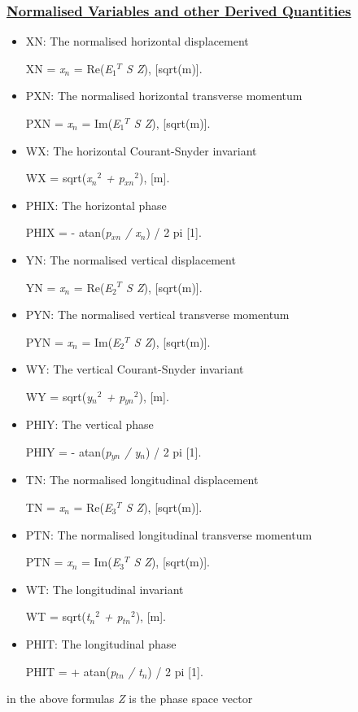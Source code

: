 \subsubsection{\href{normal}{Normalised Variables and other Derived Quantities}}
\begin{itemize}
	\item XN: The normalised horizontal displacement     

XN = \textit{x$_n$} = Re(\textit{E$_1$$^T$ S Z}), [sqrt(m)].     


	\item PXN: The normalised horizontal transverse momentum     

PXN = \textit{x$_n$} = Im(\textit{E$_1$$^T$ S Z}), [sqrt(m)].     


	\item WX: The horizontal Courant-Snyder invariant     

WX = sqrt(\textit{x$_n$$^2$ + p$_{xn}$$^2$}), [m].     


	\item PHIX: The horizontal phase     

PHIX = - atan(\textit{p$_{xn}$ / x$_n$}) / 2 pi [1].     


	\item YN: The normalised vertical displacement     

YN = \textit{x$_n$} = Re(\textit{E$_2$$^T$ S Z}), [sqrt(m)].     


	\item PYN: The normalised vertical transverse momentum     

PYN = \textit{x$_n$} = Im(\textit{E$_2$$^T$ S Z}), [sqrt(m)].     


	\item WY: The vertical Courant-Snyder invariant     

WY = sqrt(\textit{y$_n$$^2$ + p$_{yn}$$^2$}), [m].     


	\item PHIY: The vertical phase     

PHIY = - atan(\textit{p$_{yn}$ / y$_n$}) / 2 pi [1].     


	\item TN: The normalised longitudinal displacement     

TN = \textit{x$_n$} = Re(\textit{E$_3$$^T$ S Z}), [sqrt(m)].     


	\item PTN: The normalised longitudinal transverse momentum     

PTN = \textit{x$_n$} = Im(\textit{E$_3$$^T$ S Z}), [sqrt(m)].     


	\item WT: The longitudinal invariant     

WT = sqrt(\textit{t$_n$$^2$ + p$_{tn}$$^2$}), [m].     


	\item PHIT: The longitudinal phase     

PHIT = + atan(\textit{p$_{tn}$ / t$_n$}) / 2 pi [1].     


\end{itemize} in the above formulas \textit{Z} is the phase space vector 

